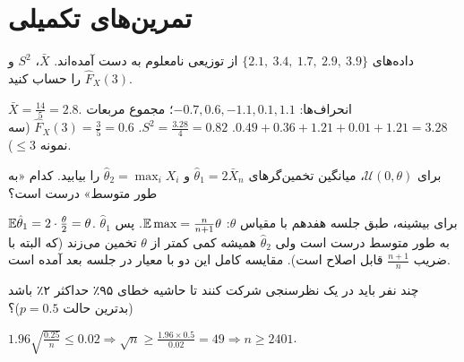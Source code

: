 \section{تمرین‌های تکمیلی}

\begin{exercise}
داده‌های $\{2.1,\ 3.4,\ 1.7,\ 2.9,\ 3.9\}$ از توزیعی نامعلوم به دست آمده‌اند. $\bar X$، $S^2$ و $\hat F_X(3)$ را حساب کنید.
\end{exercise}
\begin{solution}
$\bar X=\frac{14}{5}=2.8$. انحراف‌ها: $-0.7,0.6,-1.1,0.1,1.1$؛ مجموع مربعات $0.49+0.36+1.21+0.01+1.21=3.28$. $S^2=\frac{3.28}{4}=0.82$. $\hat F_X(3)=\frac{3}{5}=0.6$ (سه نمونه $\le3$).
\end{solution}

\begin{exercise}
برای $\mathcal U(0,\theta)$، میانگین تخمین‌گرهای $\hat\theta_1=2\bar X_n$ و $\hat\theta_2=\max_iX_i$ را بیابید. کدام «به طور متوسط» درست است؟
\end{exercise}
\begin{solution}
$\mathbb{E}\hat\theta_1=2\cdot\frac\theta2=\theta$. برای بیشینه، طبق جلسه هفدهم با مقیاس $\theta$: $\mathbb{E}\max=\frac{n}{n+1}\theta$. پس $\hat\theta_1$ به طور متوسط درست است ولی $\hat\theta_2$ همیشه کمی کمتر از $\theta$ تخمین می‌زند (که البته با ضریب $\frac{n+1}{n}$ قابل اصلاح است). مقایسه کامل این دو با معیار  در جلسه بعد آمده است.
\end{solution}

\begin{exercise}
چند نفر باید در یک نظرسنجی شرکت کنند تا حاشیه خطای ۹۵٪ حداکثر ۲٪ باشد (بدترین حالت $p=0.5$)؟
\end{exercise}
\begin{solution}
$1.96\sqrt{\frac{0.25}{n}}\le0.02\Rightarrow\sqrt n\ge\frac{1.96\times0.5}{0.02}=49\Rightarrow n\ge2401$.
\end{solution}
